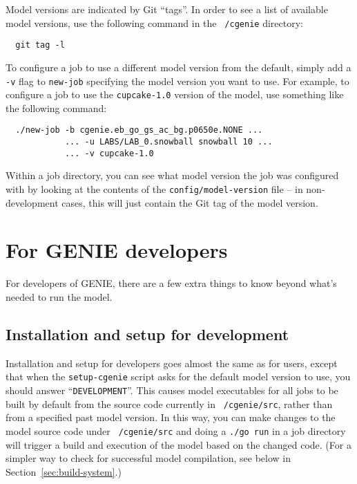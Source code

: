 \documentclass[a4paper,10pt,article]{memoir}
\begin{document}
Model versions are indicated by Git ``tags''.  In order to see a list
of available model versions, use the following command in the
\texttt{~/cgenie} directory:
\begin{verbatim}
  git tag -l
\end{verbatim}
To configure a job to use a different model version from the default,
simply add a \texttt{-v} flag to \texttt{new-job} specifying the model
version you want to use.  For example, to configure a job to use the
\texttt{cupcake-1.0} version of the model, use something like the
following command:
\begin{verbatim}
  ./new-job -b cgenie.eb_go_gs_ac_bg.p0650e.NONE ...
            ... -u LABS/LAB_0.snowball snowball 10 ...
            ... -v cupcake-1.0
\end{verbatim}
Within a job directory, you can see what model version the job was
configured with by looking at the contents of the
\texttt{config/model-version} file -- in non-development cases, this
will just contain the Git tag of the model version.


\chapter{For GENIE developers}
\label{sec:genie-devs}

For developers of GENIE, there are a few extra things to know beyond
what's needed to run the model.

\section{Installation and setup for development}

Installation and setup for developers goes almost the same as for
users, except that when the \texttt{setup-cgenie} script asks for the
default model version to use, you should answer
``\texttt{DEVELOPMENT}''.  This causes model executables for all jobs
to be built by default from the source code currently in
\texttt{~/cgenie/src}, rather than from a specified past model
version.  In this way, you can make changes to the model source code
under \texttt{~/cgenie/src} and doing a \texttt{./go run} in a job
directory will trigger a build and execution of the model based on the
changed code.  (For a simpler way to check for successful model
compilation, see below in Section~\ref{sec:build-system}.)
\end{document}
